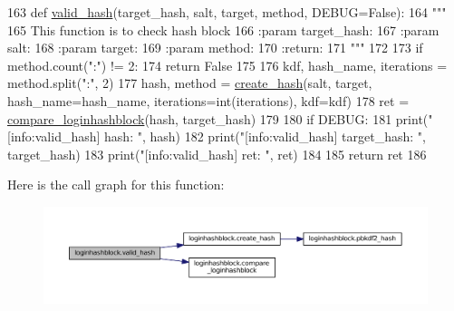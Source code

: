 \begin{DoxyCode}
163 \textcolor{keyword}{def }\hyperlink{namespaceloginhashblock_ac7faa165bc305e611390727f11946424}{valid\_hash}(target\_hash, salt, target, method, DEBUG=False):
164     \textcolor{stringliteral}{"""}
165 \textcolor{stringliteral}{    This function is to check hash block}
166 \textcolor{stringliteral}{    :param target\_hash:}
167 \textcolor{stringliteral}{    :param salt:}
168 \textcolor{stringliteral}{    :param target:}
169 \textcolor{stringliteral}{    :param method:}
170 \textcolor{stringliteral}{    :return:}
171 \textcolor{stringliteral}{    """}
172 
173     \textcolor{keywordflow}{if} method.count(\textcolor{stringliteral}{":"}) != 2:
174         \textcolor{keywordflow}{return} \textcolor{keyword}{False}
175 
176     kdf, hash\_name, iterations = method.split(\textcolor{stringliteral}{":"}, 2)
177     hash, method = \hyperlink{namespaceloginhashblock_a935d8ae1c51e50f9e5db6a1d5f02b1b8}{create\_hash}(salt, target, hash\_name=hash\_name, iterations=int(iterations), 
      kdf=kdf)
178     ret = \hyperlink{namespaceloginhashblock_ac24dd842eb90e0ede55e842d44148d5b}{compare\_loginhashblock}(hash, target\_hash)
179 
180     \textcolor{keywordflow}{if} DEBUG:
181         print(\textcolor{stringliteral}{"[info:valid\_hash]        hash: "}, hash)
182         print(\textcolor{stringliteral}{"[info:valid\_hash] target\_hash: "}, target\_hash)
183         print(\textcolor{stringliteral}{"[info:valid\_hash]         ret: "}, ret)
184 
185     \textcolor{keywordflow}{return} ret
186 
\end{DoxyCode}


Here is the call graph for this function\+:\nopagebreak
\begin{figure}[H]
\begin{center}
\leavevmode
\includegraphics[width=350pt]{namespaceloginhashblock_ac7faa165bc305e611390727f11946424_cgraph}
\end{center}
\end{figure}


